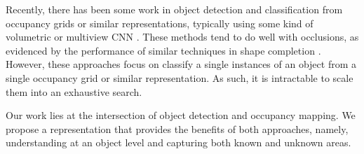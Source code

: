 Recently, there has been some work in object detection and classification from
occupancy grids or similar representations, typically using some kind of
volumetric or multiview \ac{CNN} \cite{qi2016volumetric, maturana2015voxnet}.
These methods tend to do well with occlusions, as evidenced by the
performance of similar techniques in shape completion \cite{smith2017CORL,
  dai2017complete}. However, these approaches focus on classify a single
instances of an object from a single occupancy grid or similar representation.
As such, it is intractable to scale them into an exhaustive search.

Our work lies at the intersection of object detection and occupancy mapping. We
propose a representation that provides the benefits of both approaches, namely,
understanding at an object level and capturing both known and unknown areas.

